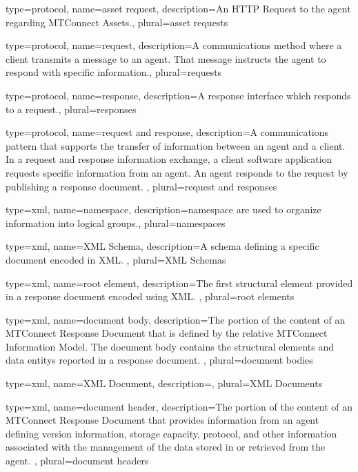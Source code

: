 {
	type={protocol},
    name={asset request},
	description={An \gls{HTTP Request} to the \gls{agent} regarding \glspl{MTConnect Asset}.},
	plural={asset requests}
}

{
	type={protocol},
    name={request},
	description={A communications method where a \gls{client} transmits a message to an \gls{agent}.  That message instructs the \gls{agent} to respond with specific information.},
	plural={requests}
}

{
	type={protocol},
    name={response},
	description={A response \gls{interface} which responds to a \gls{request}.},
	plural={responses}
}

{
	type={protocol},
    name={request and response},
	description={A communications pattern that supports the transfer of information between an \gls{agent} and a \gls{client}. 
In a \gls{request and response} information exchange, a client software application requests specific information from an \gls{agent}. An \gls{agent} responds to the \gls{request} by publishing a \gls{response document}. },
	plural={request and responses}
}

{
	type={xml},
    name={namespace},
	description={\gls{namespace} are used to organize information into logical groups.},
	plural={namespaces}
}

{
	type={xml},
    name={XML Schema},
	description={A \gls{schema} defining a specific document encoded in XML.
},
	plural={XML Schemas}
}

{
	type={xml},
    name={root element},
	description={The first \gls{structural element} provided in a \gls{response document} encoded using XML. },
	plural={root elements}
}

{
	type={xml},
    name={document body},
	description={The portion of the content of an \gls{MTConnect Response Document} that is defined by the relative \gls{MTConnect Information Model}. The \gls{document body} contains the \glspl{structural element} and \glspl{data entity} reported in a \gls{response document}.
},
	plural={document bodies}
}

{
	type={xml},
    name={XML Document},
	description={},
	plural={XML Documents}
}

{
	type={xml},
    name={document header},
	description={The portion of the content of an \gls{MTConnect Response Document} that provides information from an \gls{agent} defining version information, storage capacity, protocol, and other information associated with the management of the data stored in or retrieved from the \gls{agent}.
},
	plural={document headers}
}

